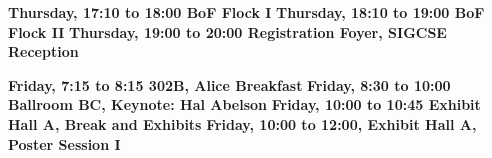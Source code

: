\noindent
{\sffamily\bfseries Thursday, 17:10 to 18:00  BoF Flock I}\newline\noindent 
{\sffamily\bfseries Thursday, 18:10 to 19:00 BoF Flock II}\newline\noindent
{\sffamily\bfseries Thursday, 19:00 to 20:00 Registration Foyer, SIGCSE Reception}\newline\noindent



%
%
\noindent
{\sffamily\bfseries Friday, 7:15 to 8:15 302B, Alice Breakfast}\newline\noindent
{\sffamily\bfseries Friday, 8:30 to 10:00 Ballroom BC, Keynote: Hal Abelson}\newline\noindent
{\sffamily\bfseries Friday, 10:00 to 10:45 Exhibit Hall A, Break and Exhibits}\newline\noindent
{\sffamily\bfseries Friday, 10:00 to 12:00, Exhibit Hall A, Poster Session I}\newline\noindent
